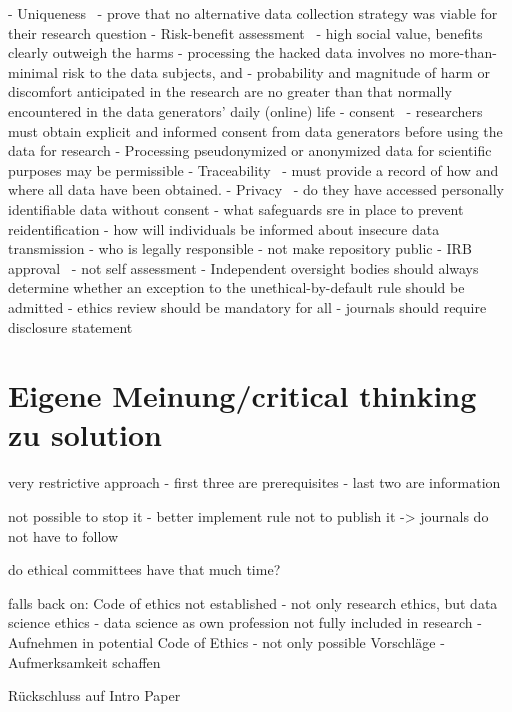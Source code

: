 - Uniqueness~\parencite[][747]{nature}
  - prove that no alternative data collection strategy was viable for their research question
- Risk-benefit assessment~\parencite[][747]{nature}
  - high social value, benefits clearly outweigh the harms
  - processing the hacked data involves no more-than-minimal risk to the data subjects, and
  - probability and magnitude of harm or discomfort anticipated in the research are no greater than that normally encountered in the data generators’ daily (online) life
- consent~\parencite[][747]{nature}
  - researchers must obtain explicit and informed consent from data generators before using the data for research
  - Processing pseudonymized or anonymized data for scientific purposes may be permissible
- Traceability~\parencite[][747]{nature}
  - must provide a record of how and where all data have been obtained.
- Privacy~\parencite[][747]{nature}
  - do they have accessed personally identifiable data without consent
  - what safeguards sre in place to prevent reidentification
  - how will individuals be informed about insecure data transmission
  - who is legally responsible
  - not make repository public
- IRB approval~\parencite[][748]{nature}
  - not self assessment
  - Independent oversight bodies should always determine whether an exception to the unethical-by-default rule should be admitted
  - ethics review should be mandatory for all
  - journals should require disclosure statement


\section*{Eigene Meinung/critical thinking zu solution}

very restrictive approach
- first three are prerequisites
- last two are information

not possible to stop it
- better implement rule not to publish it -> journals do not have to follow

do ethical committees have that much time?

falls back on:
Code of ethics not established
- not only research ethics, but data science ethics
- data science as own profession not fully included in research
- Aufnehmen in potential Code of Ethics
  - not only possible Vorschläge
- Aufmerksamkeit schaffen


Rückschluss auf Intro Paper
